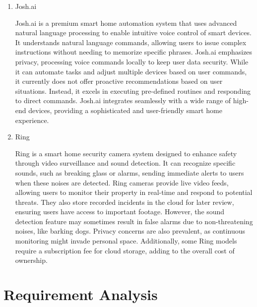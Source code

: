 \documentclass[conference]{IEEEtran}
\begin{document}
\begin{enumerate}[label=\arabic*]
    \vspace{1em}

    \item Josh.ai\par
    \vspace{0.3em}
    Josh.ai is a premium smart home automation system that uses advanced natural language processing to enable intuitive voice control of smart devices. It understands natural language commands, allowing users to issue complex instructions without needing to memorize specific phrases. Josh.ai emphasizes privacy, processing voice commands locally to keep user data security. While it can automate tasks and adjust multiple devices based on user commands, it currently does not offer proactive recommendations based on user situations. Instead, it excels in executing pre-defined routines and responding to direct commands. Josh.ai integrates seamlessly with a wide range of high-end devices, providing a sophisticated and user-friendly smart home experience.    

    \vspace{1em}

    \item Ring\par
    \vspace{0.3em}
    Ring is a smart home security camera system designed to enhance safety through video surveillance and sound detection. It can recognize specific sounds, such as breaking glass or alarms, sending immediate alerts to users when these noises are detected. Ring cameras provide live video feeds, allowing users to monitor their property in real-time and respond to potential threats. They also store recorded incidents in the cloud for later review, ensuring users have access to important footage. However, the sound detection feature may sometimes result in false alarms due to non-threatening noises, like barking dogs. Privacy concerns are also prevalent, as continuous monitoring might invade personal space. Additionally, some Ring models require a subscription fee for cloud storage, adding to the overall cost of ownership.
\end{enumerate}

\vspace{1em} %

\section{Requirement Analysis}
\end{document}
